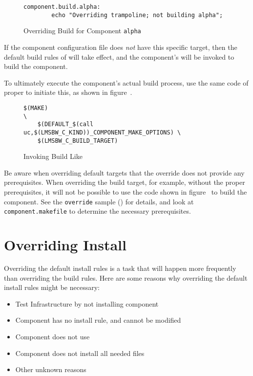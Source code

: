 \begin{figure}[ht]
  \hrulefill
\begin{verbatim}
component.build.alpha:
        echo "Overriding trampoline; not building alpha";
\end{verbatim}
  \caption{Overriding Build for Component \texttt{alpha}}\label{overriding:override-build-alpha}
  \hrulefill
\end{figure}


If the component configuration file does \emph{not} have this specific
target, then the default build rules of \lmsbw will take effect, and
the component's \makefile will be invoked to build the component.

To ultimately execute the component's actual build process, use the
same code of \lmsbw proper to initiate this, as shown in
figure~.

\begin{figure}[ht]
  \hrulefill
\begin{footnotesize}
\begin{verbatim}
$(MAKE)                                                          \
    $(DEFAULT_$(call uc,$(LMSBW_C_KIND))_COMPONENT_MAKE_OPTIONS) \
    $(LMSBW_C_BUILD_TARGET)
\end{verbatim}
\end{footnotesize}
  \caption{Invoking Build Like \lmsbw}\label{overriding:invoke-build-like-lmsbw}
  \hrulefill
\end{figure}


Be aware when overriding default targets that the override does not
provide any prerequisites.  When overriding the build target, for
example, without the proper prerequisites, it will not be possible to
use the code shown in
figure~\tabref{overriding:invoke-build-like-lmsbw} to build the
component.  See the \texttt{override} sample ()
for details, and look at \texttt{component.makefile} to determine the
necessary prerequisites.

\section{Overriding Install}\label{overriding:overriding-install}

Overriding the default install rules is a task that will happen more
frequently than overriding the build rules.  Here are some reasons why
overriding the default install rules might be necessary:

\begin{itemize}
\item Test \bni Infrastructure by not installing component
\item Component \makefile has no install rule, and cannot be modified
\item Component \makefile does not use \destdir
\item Component does not install all needed files
\item Other unknown reasons
\end{itemize}

